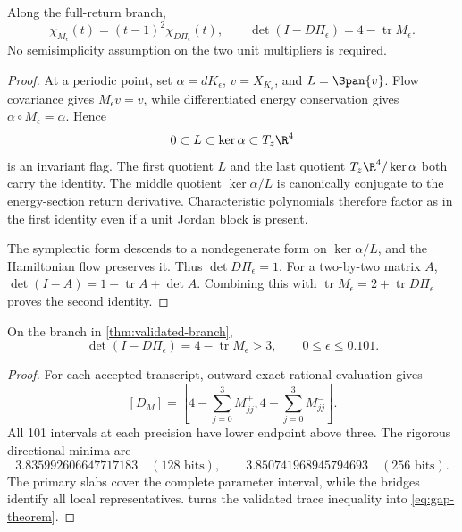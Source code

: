 \begin{proposition}
\label{prop:quotient-identity}
Along the full-return branch,
\begin{equation}
 \chi_{M_\epsilon}(t)=(t-1)^2\chi_{D\Pi_\epsilon}(t),
 \qquad
 \det(I-D\Pi_\epsilon)=4-\operatorname{tr}M_\epsilon.
 \label{eq:quotient-identity}
\end{equation}
No semisimplicity assumption on the two unit multipliers is required.
\end{proposition}

\begin{proof}
At a periodic point, set
\(\alpha=dK_\epsilon\), \(v=X_{K_\epsilon}\), and
\(L=\Span\{v\}\).  Flow covariance gives \(M_\epsilon v=v\), while
differentiated energy conservation gives
\(\alpha\circ M_\epsilon=\alpha\).  Hence
\begin{equation}
 0\subset L\subset\ker\alpha\subset T_z\R^4
 \label{eq:invariant-flag}
\end{equation}
is an invariant flag.  The first quotient \(L\) and the last quotient
\(T_z\R^4/\ker\alpha\) both carry the identity.  The middle quotient
\(\ker\alpha/L\) is canonically conjugate to the energy-section return
derivative.  Characteristic polynomials therefore factor as in the first
identity even if a unit Jordan block is present.

The symplectic form descends to a nondegenerate form on
\(\ker\alpha/L\), and the Hamiltonian flow preserves it.  Thus
\(\det D\Pi_\epsilon=1\).  For a two-by-two matrix \(A\),
\(\det(I-A)=1-\operatorname{tr}A+\det A\).  Combining this with
\(\operatorname{tr}M_\epsilon=2+\operatorname{tr}D\Pi_\epsilon\) proves
the second identity.
\end{proof}

\begin{theorem}
\label{thm:monodromy-gap}
On the branch in \cref{thm:validated-branch},
\begin{equation}
 \boxed{
 \det(I-D\Pi_\epsilon)
 =4-\operatorname{tr}M_\epsilon>3,
 \qquad 0\le\epsilon\le0.101.}
 \label{eq:gap-theorem}
\end{equation}
\end{theorem}

\begin{proof}
For each accepted transcript, outward exact-rational evaluation gives
\[
 [D_M]=\left[4-\sum_{j=0}^3M_{jj}^{+},
              4-\sum_{j=0}^3M_{jj}^{-}\right].
\]
All 101 intervals at each precision have lower endpoint above three.  The
rigorous directional minima are
\begin{equation}
 3.835992606647717183\quad(128\text{ bits}),
 \qquad
 3.850741968945794693\quad(256\text{ bits}).
 \label{eq:gap-minima}
\end{equation}
The primary slabs cover the complete parameter interval, while the bridges
identify all local representatives.   turns
the validated trace inequality into \cref{eq:gap-theorem}.
\end{proof}

